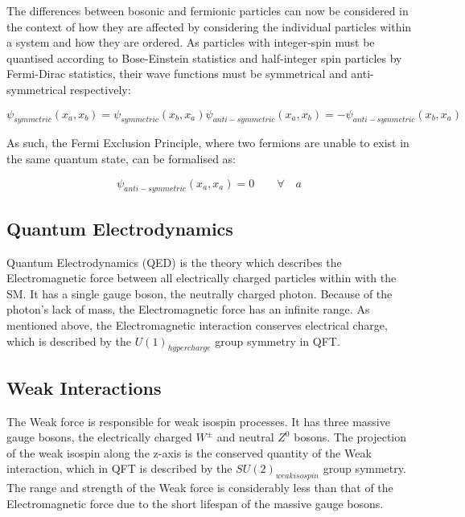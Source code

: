The differences between bosonic and fermionic particles can now be considered in the context of how they are affected by considering the individual particles within a system and how they are ordered. 
As particles with integer-spin must be quantised according to Bose-Einstein statistics and half-integer spin particles by Fermi-Dirac statistics, their wave functions must be symmetrical and anti-symmetrical respectively\cite{QM}:

\begin{equation}
\psi_{symmetric}(x_{a},x_{b}) = \psi_{symmetric}(x_{b},x_{a})
\psi_{anti-symmetric}(x_{a},x_{b}) = -\psi_{anti-symmetric}(x_{b},x_{a})
\end{equation}

As such, the Fermi Exclusion Principle, where two fermions are unable to exist in the same quantum state, can be formalised as\cite{QM}:

\begin{equation}
\psi_{anti-symmetric}(x_{a},x_{a}) = 0 \qquad \forall \quad a
\end{equation}

\subsection{Quantum Electrodynamics}\label{subsec:QED}
Quantum Electrodynamics (QED) is the theory which describes the Electromagnetic force between all electrically charged particles within with the SM. 
It has a single gauge boson, the neutrally charged photon. 
Because of the photon's lack of mass, the Electromagnetic force has an infinite range. 
As mentioned above, the Electromagnetic interaction conserves electrical charge, which is described by the $U(1)_{hypercharge}$ group symmetry in QFT\cite{QFT}. 

\subsection{Weak Interactions}\label{subsec:weakForce}
The Weak force is responsible for weak isospin processes. 
It has three massive gauge bosons, the electrically charged $W^{\pm}$ and neutral $Z^{0}$ bosons. 
The projection of the weak isospin along the z-axis is the conserved quantity of the Weak interaction, which in QFT is described by the $SU(2)_{weak isospin}$ group symmetry. 
The range and strength of the Weak force is considerably less than that of the Electromagnetic force due to the short lifespan of the massive gauge bosons\cite{ElectroweakStrong}. 


